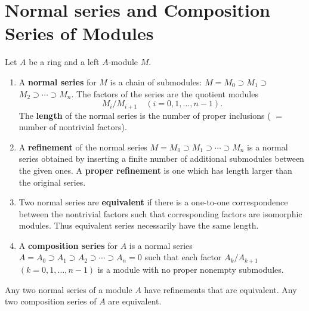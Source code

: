 \section{Normal series and Composition Series of Modules} %
\begin{definition}
    Let $A$ be a ring and a left $A$-module $M$.
    \begin{enumerate}
        \item
              A \textbf{normal series} for $M$ is a chain of submodules: $M=M_0 \supset M_1 \supset$ $M_2 \supset \cdots \supset M_n$. The factors of the series are the quotient modules
              \begin{equation*}
                  M_i / M_{i+1} \quad(i=0,1, \ldots, n-1) .
              \end{equation*}
              The \textbf{length} of the normal series is the number of proper inclusions ( $=$ number of nontrivial factors).

        \item
              A \textbf{refinement} of the normal series $M=M_0 \supset M_1 \supset \cdots \supset M_n$ is a normal series obtained by inserting a finite number of additional submodules between the given ones. A \textbf{proper refinement} is one which has length larger than the original series.

        \item
              Two normal series are \textbf{equivalent} if there is a one-to-one correspondence between the nontrivial factors such that corresponding factors are isomorphic modules. Thus equivalent series necessarily have the same length.

        \item
              A \textbf{composition series} for $A$ is a normal series $A=A_0 \supset A_1 \supset A_2 \supset \cdots \supset A_n=0$ such that each factor $A_k / A_{k+1}$ $(k=0,1, \ldots, n-1)$ is a module with no proper nonempty submodules.
    \end{enumerate}
\end{definition}
\begin{theorem}
    \label{thm: Uniqueness of composition series of modules}
    Any two normal series of a module $A$ have refinements that are equivalent.
    Any two composition series of $A$ are equivalent.
\end{theorem}

